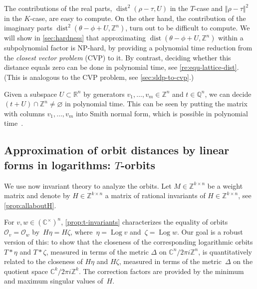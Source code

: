 \documentclass[a4paper,USenglish,cleveref,numberwithinsect]{lipics-v2021}
\DeclareMathOperator{\Log}{Log}
\DeclareMathOperator{\dist}{dist}
\newcommand{\QQ}{\mathbb{Q}}
\newcommand{\CC}{\mathbb{C}}
\newcommand{\ZZ}{\mathbb{Z}}
\newcommand{\RR}{\mathbb{R}}
\newcommand{\OO}{\ensuremath{\mathcal{O}}}
\numberwithin{equation}{section}
\begin{document}
The contributions of the real parts,
$\dist^2(\rho-\tau,U)$ in the $T$-case and $\Vert\rho-\tau\Vert^2$ in the $K$-case,
are easy to compute.
On the other hand, the contribution of the imaginary parts
$\dist^2(\theta-\phi + U, \ZZ^n)$,
turn out to be difficult to compute.
We will show in \cref{sec:hardness} that approximating
$\dist(\theta-\phi +U,\ZZ^n)$ within a subpolynomial factor is \textsc{NP}-hard,
by providing a polynomial time reduction from the \textit{closest vector problem} (CVP) to it.
By contrast, deciding whether this distance equals zero can be done in polynomial time, see \cref{re:equ-lattice-dist}.
(This is analogous to the \textsc{CVP} problem, see \cref{sec:sldp-to-cvp}.)

\begin{remark}\label{re:equ-lattice-dist}
Given a subspace $U\subset\RR^n$
by generators $v_1,\ldots,v_m\in\ZZ^n$ and
$t\in\QQ^n$, we can decide
$(t + U) \cap \ZZ^n \neq \varnothing$
in polynomial time. This can be seen by
putting the matrix with columns $v_1,\ldots,v_m$
into Smith normal form, which is
possible in polynomial time~\cite{snf}.
\end{remark}

\subsection{Approximation of orbit distances by linear forms in logarithms: \texorpdfstring{$T$}{T}-orbits}
We use now invariant theory to analyze the orbits.
Let $M\in\ZZ^{k\times n}$ be a weight matrix and denote by
$H\in\ZZ^{k\times n}$ a matrix of rational invariants
of $H\in\ZZ^{k\times n}$, see \cref{prop:allaboutH}.

For $v,w\in(\CC^\times)^n$, \cref{prop:t-invariants} characterizes the equality of orbits~$\OO_v = \OO_w$ by~$H\eta = H\zeta$, where~$\eta =\Log v$ and~$\zeta = \Log w$.
Our goal is a robust version of this:
to show that the closeness of the corresponding logarithmic orbits
$T\ast \eta$ and $T\ast \zeta$,
measured in terms of the metric $\Delta$ on $\CC^n/2\pi i\ZZ^n$,
is quantitatively related to the closeness of
$H\eta$ and $H\zeta$, measured in terms of the metric~$\Delta$
on the quotient space $\CC^k/2\pi i \ZZ^k$.
The correction factors are provided by the minimum and maximum singular values of~$H$.
\end{document}
